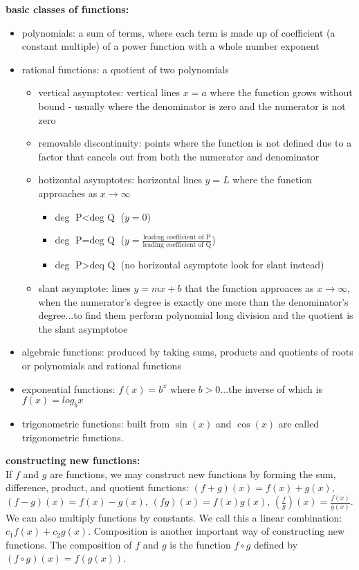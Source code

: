 \documentclass{article}
\begin{document}
\textbf{basic classes of functions:}
	\begin{itemize}
		\item polynomials: a sum of terms, where each term is made up of coefficient (a constant multiple) of a power function with a whole number exponent
		\item rational functions: a quotient of two polynomials
			\begin{itemize}
				\item vertical asymptotes: vertical lines $x = a$ where the function grows without bound - usually where the denominator is zero and the numerator is not zero
				\item removable discontinuity: points where the function is not defined due to a factor that cancels out from both the numerator and denominator
				\item hotizontal asymptotes: horizontal lines $y = L$ where the function approaches as $x \to \infty$\\
					\begin{itemize}
						\item deg $\text{P} < \text{deg Q}$ ($y = 0$)
						\item deg $\text{P} = \text{deg Q}$ ($y = \frac{\text{leading coefficient of P}}{\text{leading coefficient of Q}}$) 
						\item deg $\text{P} > \text{deq Q}$ (no horizontal asymptote look for slant instead)
					\end{itemize}
				\item slant asymptote: lines $y = mx + b$ that the function approaces as $x \to \infty$, when the numerator's degree is exactly one more than the denominator's degree...to find them perform polynomial long division and the quotient is the slant asymptotoe
			\end{itemize}
		\item algebraic functions: produced by taking sums, products and quotients of roots or polynomials and rational functions
		\item exponential functions: $f(x) = b^x$ where $b > 0$...the inverse of which is $f(x) = log_bx$
		\item trigonometric functions: built from $\sin(x)$ and $\cos(x)$ are called trigonometric functions.
	\end{itemize}

\textbf{constructing new functions:}\\
If $f$ and $g$ are functions, we may construct new functions by forming the sum, difference, product, and quotient functions: $(f + g)(x) = f(x) + g(x)$, $(f - g)(x) = f(x) - g(x)$, $(fg)(x) = f(x)g(x)$, $(\frac{f}{g})(x) = \frac{f(x)}{g(x)}$. We can also multiply functions by constants. We call this a linear combination: $c_1f(x) + c_2g(x)$. Composition is another important way of constructing new functions. The composition of $f$ and $g$ is the function $f \circ g$ defined by $(f \circ g)(x) = f(g(x))$.\\
\end{document}
